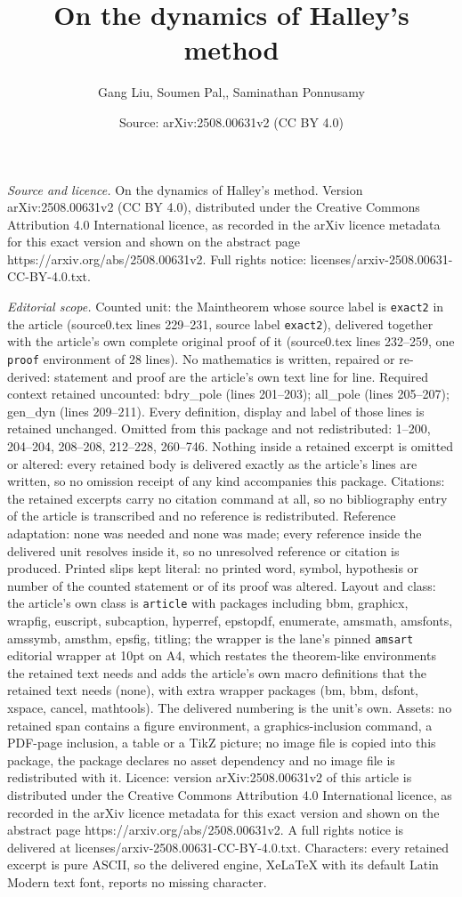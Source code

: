 \documentclass[10pt,a4paper]{amsart}
\title[On the dynamics of Halley's method]{On the dynamics of Halley's method}
\author{Gang Liu, Soumen Pal,, Saminathan Ponnusamy}
\date{Source: arXiv:2508.00631v2 (CC BY 4.0)}
\begin{document}
\maketitle

\noindent\emph{Source and licence.} On the dynamics of Halley's method. Version arXiv:2508.00631v2 (CC BY 4.0), distributed under the Creative Commons Attribution 4.0 International licence, as recorded in the arXiv licence metadata for this exact version and shown on the abstract page https://arxiv.org/abs/2508.00631v2. Full rights notice: licenses/arxiv-2508.00631-CC-BY-4.0.txt.\par\smallskip

\noindent\textit{Editorial scope.} Counted unit: the Maintheorem whose source label is \texttt{exact2} in the article (source0.tex lines 229--231, source label \texttt{exact2}), delivered together with the article's own complete original proof of it (source0.tex lines 232--259, one \texttt{proof} environment of 28 lines). No mathematics is written, repaired or re-derived: statement and proof are the article's own text line for line. Required context retained uncounted: bdry\_pole (lines 201--203); all\_pole (lines 205--207); gen\_dyn (lines 209--211). Every definition, display and label of those lines is retained unchanged. Omitted from this package and not redistributed: 1--200, 204--204, 208--208, 212--228, 260--746. Nothing inside a retained excerpt is omitted or altered: every retained body is delivered exactly as the article's lines are written, so no omission receipt of any kind accompanies this package. Citations: the retained excerpts carry no citation command at all, so no bibliography entry of the article is transcribed and no reference is redistributed. Reference adaptation: none was needed and none was made; every reference inside the delivered unit resolves inside it, so no unresolved reference or citation is produced. Printed slips kept literal: no printed word, symbol, hypothesis or number of the counted statement or of its proof was altered. Layout and class: the article's own class is \texttt{article} with packages including bbm, graphicx, wrapfig, euscript, subcaption, hyperref, epstopdf, enumerate, amsmath, amsfonts, amssymb, amsthm, epsfig, titling; the wrapper is the lane's pinned \texttt{amsart} editorial wrapper at 10pt on A4, which restates the theorem-like environments the retained text needs and adds the article's own macro definitions that the retained text needs (none), with extra wrapper packages (bm, bbm, dsfont, xspace, cancel, mathtools). The delivered numbering is the unit's own. Assets: no retained span contains a figure environment, a graphics-inclusion command, a PDF-page inclusion, a table or a TikZ picture; no image file is copied into this package, the package declares no asset dependency and no image file is redistributed with it. Licence: version arXiv:2508.00631v2 of this article is distributed under the Creative Commons Attribution 4.0 International licence, as recorded in the arXiv licence metadata for this exact version and shown on the abstract page https://arxiv.org/abs/2508.00631v2. A full rights notice is delivered at licenses/arxiv-2508.00631-CC-BY-4.0.txt. Characters: every retained excerpt is pure ASCII, so the delivered engine, XeLaTeX with its default Latin Modern text font, reports no missing character.
\end{document}
